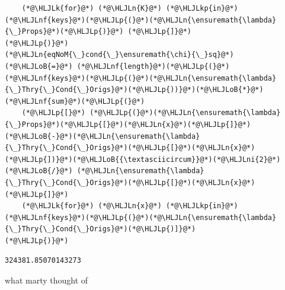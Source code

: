 \documentclass[12pt,a4paper]{article}
\newcommand{\HLJLk}[1]{\textcolor[RGB]{148,91,176}{\textbf{#1}}}
\newcommand{\HLJLkp}[1]{\textcolor[RGB]{148,91,176}{\textbf{#1}}}
\newcommand{\HLJLn}[1]{#1}
\newcommand{\HLJLnf}[1]{\textcolor[RGB]{66,102,213}{#1}}
\newcommand{\HLJLni}[1]{\textcolor[RGB]{59,151,46}{#1}}
\newcommand{\HLJLoB}[1]{\textcolor[RGB]{102,102,102}{\textbf{#1}}}
\newcommand{\HLJLp}[1]{#1}
\begin{document}
\begin{lstlisting}
	(*@\HLJLk{for}@*) (*@\HLJLn{K}@*) (*@\HLJLkp{in}@*) (*@\HLJLnf{keys}@*)(*@\HLJLp{(}@*)(*@\HLJLn{\ensuremath{\lambda}{\_}Props}@*)(*@\HLJLp{)}@*) (*@\HLJLp{]}@*)
(*@\HLJLp{)}@*)
(*@\HLJLn{eqNoM{\_}cond{\_}\ensuremath{\chi}{\_}sq}@*) (*@\HLJLoB{=}@*) (*@\HLJLnf{length}@*)(*@\HLJLp{(}@*)(*@\HLJLnf{keys}@*)(*@\HLJLp{(}@*)(*@\HLJLn{\ensuremath{\lambda}{\_}Thry{\_}Cond{\_}Origs}@*)(*@\HLJLp{))}@*)(*@\HLJLoB{*}@*)(*@\HLJLnf{sum}@*)(*@\HLJLp{(}@*)
	(*@\HLJLp{[}@*) (*@\HLJLp{(}@*)(*@\HLJLn{\ensuremath{\lambda}{\_}Props}@*)(*@\HLJLp{[}@*)(*@\HLJLn{x}@*)(*@\HLJLp{]}@*)(*@\HLJLoB{-}@*)(*@\HLJLn{\ensuremath{\lambda}{\_}Thry{\_}Cond{\_}Origs}@*)(*@\HLJLp{[}@*)(*@\HLJLn{x}@*)(*@\HLJLp{])}@*)(*@\HLJLoB{{\textasciicircum}}@*)(*@\HLJLni{2}@*) (*@\HLJLoB{/}@*) (*@\HLJLn{\ensuremath{\lambda}{\_}Thry{\_}Cond{\_}Origs}@*)(*@\HLJLp{[}@*)(*@\HLJLn{x}@*)(*@\HLJLp{]}@*)
	(*@\HLJLk{for}@*) (*@\HLJLn{x}@*) (*@\HLJLkp{in}@*) (*@\HLJLnf{keys}@*)(*@\HLJLp{(}@*)(*@\HLJLn{\ensuremath{\lambda}{\_}Thry{\_}Cond{\_}Origs}@*)(*@\HLJLp{)]}@*)
(*@\HLJLp{)}@*)
\end{lstlisting}

\begin{lstlisting}
324381.85070143273
\end{lstlisting}


what marty thought of
\end{document}
